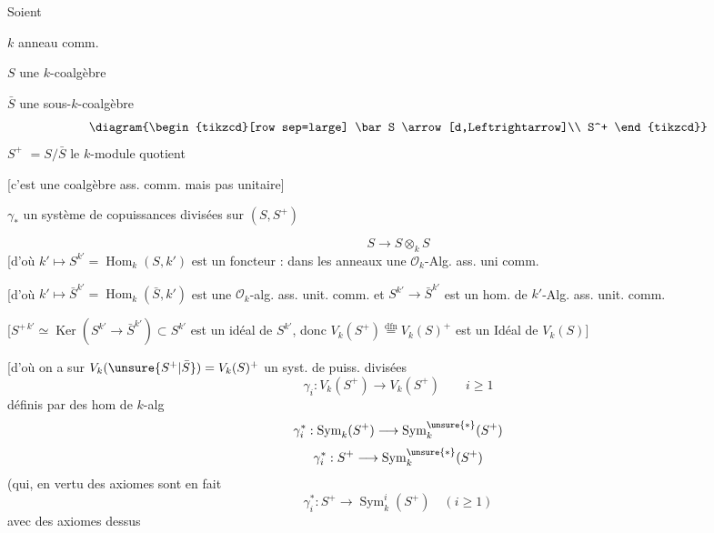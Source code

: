 \begin{flushright}
\end{flushright}
\begin{minipage}[t]{.43\linewidth}
Soient

$k$ anneau comm.

 \textcircled{$S$} une $k$-coalgèbre 


\textcircled{$\bar S$} une sous-$k$-coalgèbre 
\[
\diagram{\begin{tikzcd}[row sep=large]
\bar S \arrow[d,Leftrightarrow]\\
S^+
\end{tikzcd}}
\]
\textcircled{$S^+$} $=S/\bar S$ le $k$-module quotient

[c'est une coalgèbre ass. comm. mais pas unitaire]

\textcircled{$\gamma_*$} un système de copuissances divisées sur $(S,S^+)$
\end{minipage}\hfill
\begin{minipage}[t]{.54\linewidth}
\[
\boxed{S\longrightarrow S\otimes_k S}
\]
[d'où  $k'\longmapsto S^{k'}=\operatorname{Hom}_k(S,k')$ est un foncteur :  dans les anneaux   une $\mathcal O_k$-Alg. ass. uni comm.

[d'où  $k'\longmapsto\bar S^{k'}=\operatorname{Hom}_k(\bar S,k')$ est une $\mathcal O_k$-alg. ass. unit. comm. et $S^{k'}\longrightarrow\bar S^{k'}$ est un hom. de $k'$-Alg. ass. unit. comm. 

[$S^{+\,k'}\simeq\operatorname{Ker}(S^{k'}\longrightarrow\bar S^{k'})\subset S^{k'}$ est un idéal de $S^{k'}$, donc $V_k(S^+)\overset{\mathrm{dfn}}=V_k(S)^+$ est un Idéal de $V_k(S)$]

[d'où on a sur $V_k(\unsure{S^+|\bar S})=V_k(S)^+$ un syst. de puiss. divisées
\[
\gamma_i:V_k(S^+)\longrightarrow V_k(S^+)\qquad i\geq1
\]
définis par des hom de $k$-alg
\[
\gamma_i^*:\operatorname{Sym}_k(S^+)\longrightarrow\operatorname{Sym}_k^{\unsure{*}}(S^+)
\]
 
\[
\gamma_i^*:S^+\longrightarrow\operatorname{Sym}_k^{\unsure{*}}(S^+)
\]
(qui, en vertu des axiomes sont en fait
\[
\boxed{\gamma_i^*:S^+\longrightarrow\operatorname{Sym}_k^i(S^+)\quad(i\geq1)}
\]
avec des axiomes dessus
\end{minipage}


